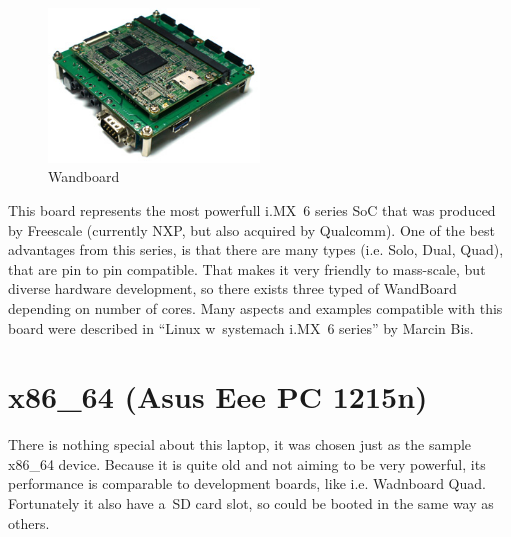 \documentclass[printmode]{mgr}
\begin{document}
\begin{figure}[htbp]
  \centering
    \includegraphics[width=0.5\textwidth]{wandboard-front.jpg}
  \caption{Wandboard}
  \label{fig:devboard-wandboard}
\end{figure}

This board represents the most powerfull i.MX~6 series SoC that was produced by Freescale (currently NXP, but also acquired by Qualcomm).
One of the best advantages from this series, is that there are many types (i.e. Solo, Dual, Quad), that are pin to pin compatible.
That makes it very friendly to mass-scale, but diverse hardware development, so there exists three typed of WandBoard depending on number of cores.
Many aspects and examples compatible with this board were described in ``Linux w~systemach i.MX~6 series'' by Marcin Bis.\cite{book:lws-imx6}



\section{x86\_64 (Asus Eee PC 1215n)}

There is nothing special about this laptop, it was chosen just as the sample x86\_64 device. Because it is quite old and not aiming to be very powerful, its performance is comparable to development boards, like i.e. Wadnboard Quad. Fortunately it also have a~SD card slot, so could be booted in the same way as others.
\end{document}

